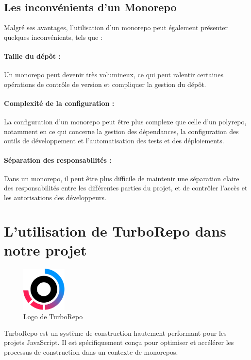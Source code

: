 \subsection{Les inconvénients d'un Monorepo}

Malgré ses avantages, l'utilisation d'un monorepo peut également présenter quelques inconvénients, tels que :

\paragraph{Taille du dépôt :} Un monorepo peut devenir très volumineux, ce qui peut ralentir certaines opérations de contrôle de version et compliquer la gestion du dépôt.
\paragraph{Complexité de la configuration :} La configuration d'un monorepo peut être plus complexe que celle d'un polyrepo, notamment en ce qui concerne la gestion des dépendances, la configuration des outils de développement et l'automatisation des tests et des déploiements.
\paragraph{Séparation des responsabilités :} Dans un monorepo, il peut être plus difficile de maintenir une séparation claire des responsabilités entre les différentes parties du projet, et de contrôler l'accès et les autorisations des développeurs.

\section{L'utilisation de TurboRepo dans notre projet}

\begin{figure}
    \centering
    \includegraphics[width=0.2\textwidth]{assets/figures/turborepo.png}
    \caption{Logo de TurboRepo}
    \label{fig:turborepo}
\end{figure}

TurboRepo\cite{Turborepo} est un système de construction hautement performant pour les projets JavaScript. Il est spécifiquement conçu pour optimiser et accélérer les processus de construction dans un contexte de monorepos.

